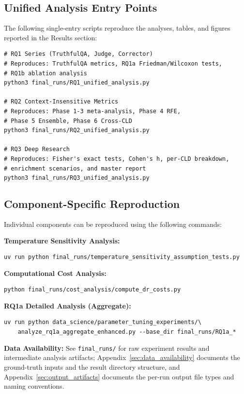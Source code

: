 \subsection{Unified Analysis Entry Points}
The following single-entry scripts reproduce the analyses, tables, and figures reported in the Results section:

\begin{verbatim}
# RQ1 Series (TruthfulQA, Judge, Corrector)
# Reproduces: TruthfulQA metrics, RQ1a Friedman/Wilcoxon tests,
# RQ1b ablation analysis
python3 final_runs/RQ1_unified_analysis.py

# RQ2 Context-Insensitive Metrics
# Reproduces: Phase 1-3 meta-analysis, Phase 4 RFE,
# Phase 5 Ensemble, Phase 6 Cross-CLD
python3 final_runs/RQ2_unified_analysis.py

# RQ3 Deep Research
# Reproduces: Fisher's exact tests, Cohen's h, per-CLD breakdown,
# enrichment scenarios, and master report
python3 final_runs/RQ3_unified_analysis.py
\end{verbatim}

\subsection{Component-Specific Reproduction}
Individual components can be reproduced using the following commands:

\textbf{Temperature Sensitivity Analysis:}
\begin{verbatim}
uv run python final_runs/temperature_sensitivity_assumption_tests.py
\end{verbatim}

\textbf{Computational Cost Analysis:}
\begin{verbatim}
python final_runs/cost_analysis/compute_dr_costs.py
\end{verbatim}

\textbf{RQ1a Detailed Analysis (Aggregate):}
\begin{verbatim}
uv run python data_science/parameter_tuning_experiments/\
    analyze_rq1a_aggregate_enhanced.py --base_dir final_runs/RQ1a_*
\end{verbatim}

\textbf{Data Availability:} See \texttt{final\_runs/} for raw experiment results and intermediate analysis artifacts; Appendix~\ref{sec:data_availability} documents the ground-truth inputs and the result directory structure, and Appendix~\ref{sec:output_artifacts} documents the per-run output file types and naming conventions.